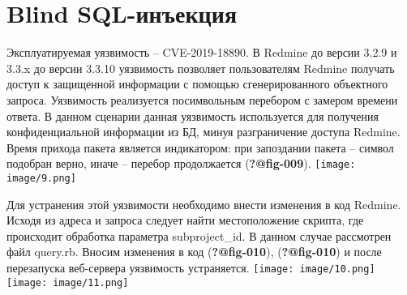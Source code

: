 \documentclass[
  12pt,
  a4paper,
  DIV=11,
  numbers=noendperiod]{scrreprt}
\begin{document}
\hypertarget{blind-sql-ux438ux43dux44aux435ux43aux446ux438ux44f}{%
\section{Blind
SQL-инъекция}\label{blind-sql-ux438ux43dux44aux435ux43aux446ux438ux44f}}

Эксплуатируемая уязвимость -- CVE-2019-18890. В Redmine до версии 3.2.9
и 3.3.x до версии 3.3.10 уязвимость позволяет пользователям Redmine
получать доступ к защищенной информации с помощью сгенерированного
объектного запроса. Уязвимость реализуется посимвольным перебором с
замером времени ответа. В данном сценарии данная уязвимость используется
для получения конфиденциальной информации из БД, минуя разграничение
доступа Redmine. Время прихода пакета является индикатором: при
запоздании пакета -- символ подобран верно, иначе -- перебор
продолжается (\textbf{?@fig-009}).
\texttt{[image: image/9.png]}

Для устранения этой уязвимости необходимо внести изменения в код
Redmine. Исходя из адреса и запроса следует найти местоположение
скрипта, где происходит обработка параметра subproject\_id. В данном
случае рассмотрен файл query.rb. Вносим изменения в код
(\textbf{?@fig-010}), (\textbf{?@fig-010}) и после перезапуска
веб-сервера уязвимость устраняется.
\texttt{[image: image/10.png]}
\texttt{[image: image/11.png]}


\printbibliography
\end{document}
